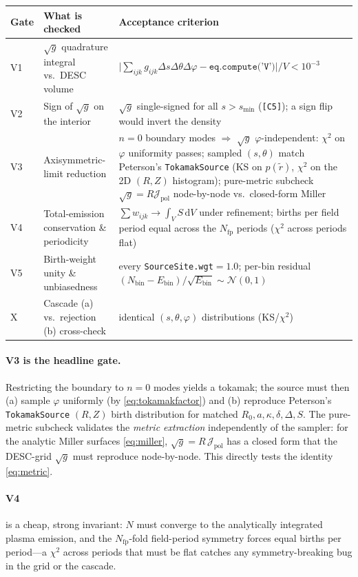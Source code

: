 \documentclass[11pt]{article}
\newcommand{\sg}{\sqrt{g}}
\newcommand{\Jpol}{\mathcal{J}_{\mathrm{pol}}}
\newcommand{\Nfp}{N_{\mathrm{fp}}}
\newcommand{\dd}{\,\mathrm{d}}
\newcommand{\code}[1]{\texttt{#1}}
\begin{document}
\begin{center}
\begin{tabular}{p{}p{}p{}}
\hline
Gate & What is checked & Acceptance criterion\\
\hline
V1 & $\sg$ quadrature integral vs.\ DESC volume &
$\big|\sum_{ijk} g_{ijk}\Delta s\Delta\theta\Delta\varphi -
\code{eq.compute('V')}\big|/V<10^{-3}$\\[2pt]
V2 & Sign of $\sg$ on the interior &
$\sg$ single-signed for all $s>s_{\min}$ (\code{[C5]}); a sign flip would invert the
density\\[2pt]
V3 & Axisymmetric-limit reduction &
$n{=}0$ boundary modes $\Rightarrow$ $\sg$ $\varphi$-independent: $\chi^2$ on
$\varphi$ uniformity passes; sampled $(s,\theta)$ match Peterson's
\code{TokamakSource} (KS on $p(\tilde r)$, $\chi^2$ on the 2D $(R,Z)$ histogram);
pure-metric subcheck $\sg\!=\!R\Jpol$ node-by-node vs.\ closed-form Miller\\[2pt]
V4 & Total-emission conservation \& periodicity &
$\sum w_{ijk}\to\int_V S\dd V$ under refinement; births per field period equal across
the $\Nfp$ periods ($\chi^2$ across periods flat)\\[2pt]
V5 & Birth-weight unity \& unbiasedness &
every \code{SourceSite.wgt}$=1.0$; per-bin residual
$(N_{\mathrm{bin}}-E_{\mathrm{bin}})/\sqrt{E_{\mathrm{bin}}}\sim\mathcal N(0,1)$\\[2pt]
X & Cascade (a) vs.\ rejection (b) cross-check &
identical $(s,\theta,\varphi)$ distributions (KS/$\chi^2$)\\
\hline
\end{tabular}
\end{center}

\paragraph{V3 is the headline gate.} Restricting the boundary to $n=0$ modes yields a
tokamak; the source must then (a) sample $\varphi$ uniformly (by
\eqref{eq:tokamakfactor}) and (b) reproduce Peterson's \code{TokamakSource}
$(R,Z)$ birth distribution for matched $R_0,a,\kappa,\delta,\Delta,S$. The
pure-metric subcheck validates the \emph{metric extraction} independently of the
sampler: for the analytic Miller surfaces \eqref{eq:miller}, $\sg=R\,\Jpol$ has a
closed form that the DESC-grid $\sg$ must reproduce node-by-node. This directly tests
the identity \eqref{eq:metric}.

\paragraph{V4} is a cheap, strong invariant: $N$ must converge to the analytically
integrated plasma emission, and the $\Nfp$-fold field-period symmetry forces equal
births per period---a $\chi^2$ across periods that must be flat catches any
symmetry-breaking bug in the grid or the cascade.
\end{document}
